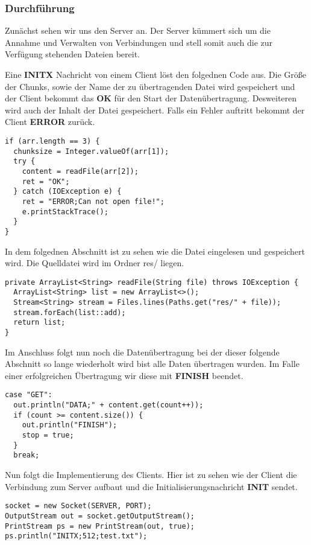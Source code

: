 \subsubsection{Durchführung}
Zunächst sehen wir uns den Server an. Der Server kümmert sich um die Annahme und Verwalten von Verbindungen und stell somit auch die zur Verfügung stehenden Dateien bereit.

Eine \textbf{INITX} Nachricht von einem Client löst den folgednen Code aus. Die Größe der Chunks, sowie der Name der zu übertragenden Datei wird gespeichert und der Client bekommt das \textbf{OK} für den Start der Datenübertragung. Desweiteren wird auch der Inhalt der Datei gespeichert. Falls ein Fehler auftritt bekommt der Client \textbf{ERROR} zurück.
\begin{lstlisting}
if (arr.length == 3) {
  chunksize = Integer.valueOf(arr[1]);
  try {
    content = readFile(arr[2]);
    ret = "OK";
  } catch (IOException e) {
    ret = "ERROR;Can not open file!";
    e.printStackTrace();
  }
}
\end{lstlisting}

In dem folgednen Abschnitt ist zu sehen wie die Datei eingelesen und gespeichert wird. Die Quelldatei wird im Ordner res/ liegen.
\begin{lstlisting}
private ArrayList<String> readFile(String file) throws IOException {
  ArrayList<String> list = new ArrayList<>();
  Stream<String> stream = Files.lines(Paths.get("res/" + file));
  stream.forEach(list::add);
  return list;
}
\end{lstlisting}

Im Anschluss folgt nun noch die Datenübertragung bei der dieser folgende Abschnitt so lange wiederholt wird bist alle Daten übertragen wurden. Im Falle einer erfolgreichen Übertragung wir diese mit \textbf{FINISH} beendet.
\begin{lstlisting}
case "GET":
  out.println("DATA;" + content.get(count++));
  if (count >= content.size()) {
    out.println("FINISH");
    stop = true;
  }
  break;
\end{lstlisting}

Nun folgt die Implementierung des Clients.
Hier ist zu sehen wie der Client die Verbindung zum Server aufbaut und die Initialisierungsnachricht \textbf{INIT} sendet.
\begin{lstlisting}
socket = new Socket(SERVER, PORT);
OutputStream out = socket.getOutputStream();
PrintStream ps = new PrintStream(out, true);
ps.println("INITX;512;test.txt");
\end{lstlisting}

